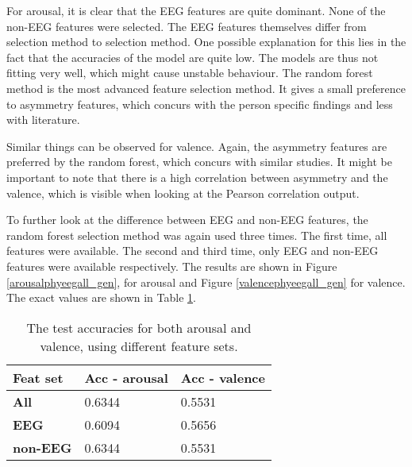 \clearpage

For arousal, it is clear that the EEG features are quite dominant. None of the non-EEG features were selected. The EEG features themselves differ from selection method to selection method. One possible explanation for this lies in the fact that the accuracies of the model are quite low. The models are thus not fitting very well, which might cause unstable behaviour. The random forest method is the most advanced feature selection method. It gives a small preference to asymmetry features, which concurs with the person specific findings and less with literature.

\npar

Similar things can be observed for valence. Again, the asymmetry features are preferred by the random forest, which concurs with similar studies. It might be important to note that there is a high correlation between asymmetry and the valence, which is visible when looking at the Pearson correlation output.

\npar

To further look at the difference between EEG and non-EEG features, the random forest selection method was again used three times. The first time, all features were available. The second and third time, only EEG and non-EEG features were available respectively. The results are shown in Figure \ref{arousalphyeegall_gen}, for arousal and Figure \ref{valencephyeegall_gen} for valence. The exact values are shown in Table \ref{phyeegallgenTable}.




\begin{table}[H]
\centering
\caption{The test accuracies for both arousal and valence, using different feature sets.\label{phyeegallgenTable}}
\begin{tabular}{l|ll}
\textbf{Feat set}  & \textbf{Acc - arousal}       & \textbf{Acc - valence}          \\ \hline
\textbf{All}       & 0.6344           & 0.5531           \\
\textbf{EEG}       & 0.6094           & 0.5656           \\
\textbf{non-EEG}   & 0.6344           & 0.5531          
\end{tabular}
\end{table}

